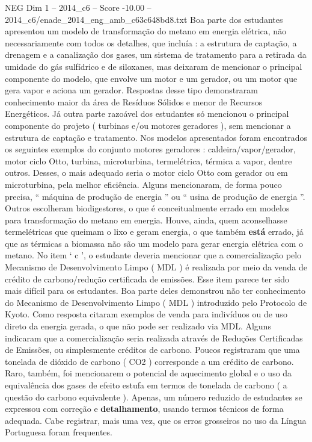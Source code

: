 \begin{textsample}{NEG Dim 1 – 2014\_c6 – Score -10.00 – 2014\_c6/enade\_2014\_eng\_amb\_c63c648bd8.txt}
Boa parte dos estudantes apresentou um modelo de transformação do metano em energia elétrica, não necessariamente com todos os detalhes, que incluía : a estrutura de captação, a drenagem e a canalização dos gases, um sistema de tratamento para a retirada da umidade do gás sulfídrico e de siloxanes, mas deixaram de mencionar o principal componente do modelo, que envolve um motor e um gerador, ou um motor que gera vapor e aciona um gerador.
Respostas desse tipo demonstraram conhecimento maior da área de Resíduos Sólidos e menor de Recursos Energéticos.
Já outra parte razoável dos estudantes só mencionou o principal componente do projeto ( turbinas e/ou motores geradores ), sem mencionar a estrutura de captação e tratamento.
Nos modelos apresentados foram encontrados os seguintes exemplos do conjunto motores geradores : caldeira/vapor/gerador, motor ciclo Otto, turbina, microturbina, termelétrica, térmica a vapor, dentre outros.
Desses, o mais adequado seria o motor ciclo Otto com gerador ou em microturbina, pela melhor eficiência.
Alguns mencionaram, de forma pouco precisa, “ máquina de produção de energia ” ou “ usina de produção de energia ”.
Outros escolheram biodigestores, o que é conceitualmente errado em modelos para transformação do metano em energia.
Houve, ainda, quem aconselhasse termelétricas que queimam o lixo e geram energia, o que também \textbf{está} errado, já que as térmicas a biomassa não são um modelo para gerar energia elétrica com o metano.
No item ‘ c ’, o estudante deveria mencionar que a comercialização pelo Mecanismo de Desenvolvimento Limpo ( MDL ) é realizada por meio da venda de crédito de carbono/redução certificada de emissões.
Esse item parece ter sido mais difícil para os estudantes.
Boa parte deles demonstrou não ter conhecimento do Mecanismo de Desenvolvimento Limpo ( MDL ) introduzido pelo Protocolo de Kyoto.
Como resposta citaram exemplos de venda para indivíduos ou de uso direto da energia gerada, o que não pode ser realizado via MDL.
Alguns indicaram que a comercialização seria realizada através de Reduções Certificadas de Emissões, ou simplesmente créditos de carbono.
Poucos registraram que uma tonelada de dióxido de carbono ( CO2 ) corresponde a um crédito de carbono.
Raro, também, foi mencionarem o potencial de aquecimento global e o uso da equivalência dos gases de efeito estufa em termos de tonelada de carbono ( a questão do carbono equivalente ).
Apenas, um número reduzido de estudantes se expressou com correção e \textbf{detalhamento}, usando termos técnicos de forma adequada.
Cabe registrar, mais uma vez, que os erros grosseiros no uso da Língua Portuguesa foram frequentes.

\end{textsample}
